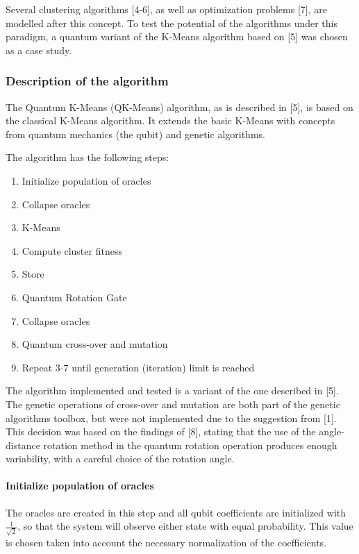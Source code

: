 \documentclass[10pt,a4paper,final]{article}
\begin{document}
Several clustering algorithms [4-6], as well as optimization problems [7], are modelled after this concept. To test the potential of the algorithms under this paradigm, a quantum variant of the K-Means algorithm based on [5] was chosen as a case study.

\subsubsection{Description of the algorithm}

The Quantum K-Means (QK-Means) algorithm, as is described in [5], is based on the classical K-Means algorithm. It extends the basic K-Means with concepts from quantum mechanics (the qubit) and genetic algorithms.

The algorithm has the following steps:
\begin{enumerate}
\item Initialize population of oracles
\item Collapse oracles
\item K-Means
\item Compute cluster fitness
\item Store
\item Quantum Rotation Gate
\item Collapse oracles
\item Quantum cross-over and mutation
\item Repeat 3-7 until generation (iteration) limit is reached
\end{enumerate}



The algorithm implemented and tested is a variant of the one described in [5]. The genetic operations of cross-over and mutation are both part of the genetic algorithms toolbox, but were not implemented due to the suggestion from [1]. This decision was based on the findings of [8], stating that the use of the angle-distance rotation method in the quantum rotation operation produces enough variability, with a careful choice of the rotation angle.

\paragraph{Initialize population of oracles}

The oracles are created in this step and all qubit coefficients are initialized with $\frac{1}{\sqrt{2}}$, so that the system will observe either state with equal probability. This value is chosen taken into account the necessary normalization of the coefficients.
\end{document}
